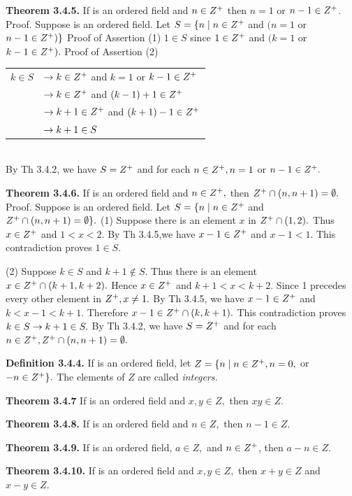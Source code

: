 \begin{large}
\textbf{Theorem 3.4.5.} If \of is an ordered field and $n\in Z^{+}$ then $n = 1$ or $n-1\in Z^{+}$.\nl
Proof. Suppose \of is an ordered field. Let $S=\{ n \mid n\in Z^{+}$  and $(n=1$ or $n-1\in Z^{+})\}$\nl
\qqu Proof of Assertion (1)\nl
$1 \in S$ since $1 \in Z^{+}$ and $(k =1$ or $k -1 \in Z^{+} ).$\nl
\qqu Proof of Assertion (2)\nl
\begin{tabular}{rl}
$k \in S$&$\to k\in Z^{+}$ and $k=1 $ or $k - 1 \in Z^{+}$\\
&$\to k \in Z^{+}$ and $(k - 1) + 1\in Z^{+}$\\
&$\to k+1 \in Z^{+}$ and $(k + 1) - 1 \in Z^{+}$\\
&$\to k+1\in S$\\
\end{tabular}\\

By Th 3.4.2, we have $S = Z^{+}$ and for each $n\in Z^{+}, n = 1$ or $n - 1\in Z^{+} .$\nl

\textbf{Theorem 3.4.6.} If \of is an ordered field and $n \in Z^{+},$ then $Z^{+} \cap (n, n+1) = \emptyset .$\nl
Proof. Suppose \of is an ordered field. Let $S=\{n \mid n\in Z^{+}$ and $Z^{+} \cap (n,n+1)= \emptyset \}.$ \nl
(1) Suppose there is an element $x$ in $Z^{+} \cap (1,2).$ Thus $x\in Z^{+} $ and $1 < x < 2.$\nl
By Th 3.4.5,we have $x-1\in Z^{+}$ and $x - 1 < 1.$ This contradiction proves $1\in S.$\nl

\newpage



(2) Suppose $k\in S$ and $k+1\notin S$. Thus there is an element $x \in Z^{+} \cap (k+1,k+2).$ Hence $x\in Z^{+}$ and $k+1<x<k+2.$ Since 1 precedes every other element in $Z^{+} , x\neq 1.$ By Th 3.4.5, we have $x-1\in Z^{+}$ and $k < x-1 < k+1.$ There­fore $x-1\in Z^{+} \cap (k,k+1).$ This contradiction proves $k\in S \to k+1\in S.$ By Th 3.4.2, we have $S=Z^{+}$ and for each $n\in Z^{+}, Z^{+} \cap (n,n+1) = \emptyset .$ \nl

\textbf{Definition 3.4.4.} If \of is an ordered field, let $Z= \{n \mid n\in Z^{+}, n =0,$ or $-n\in Z^{+} \}.$ The elements of $Z$ are called \textit{integers.}\nl

\textbf{Theorem 3.4.7}  If \of  is an ordered field and $x,y\in Z,$ then $xy\in Z.$\nl

\textbf{Theorem 3.4.8.} If \of  is an ordered field and $n\in Z,$ then $n-1\in Z.$\nl

\textbf{Theorem 3.4.9.} If \of  is an ordered field, $a\in Z,$ and $n\in Z^{+}$, then $a - n\in Z.$\nl

\textbf{Theorem 3.4.10.} If \of is an ordered field and $x,y\in Z,$ then $x+y\in Z$ and $x - y \in Z$.\nl


\end{large}
